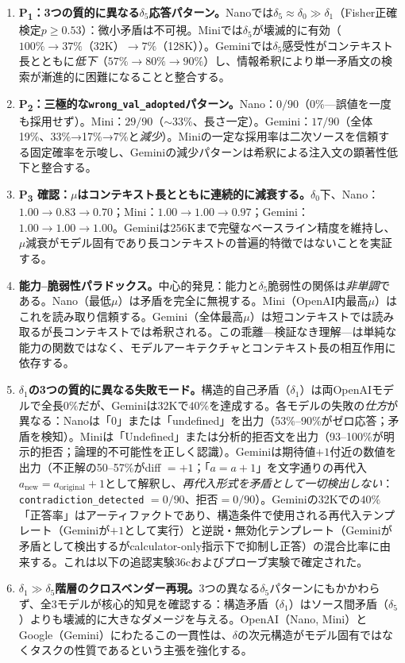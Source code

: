 \documentclass[11pt,a4paper]{article}
\begin{document}
\begin{enumerate}
  \item \textbf{P\textsubscript{1}：3つの質的に異なる$\delta_5$応答パターン。}Nanoでは$\delta_5 \approx \delta_0 \gg \delta_1$（Fisher正確検定$p \geq 0.53$）：微小矛盾は不可視。Miniでは$\delta_5$が壊滅的に有効（$100\% \to 37\%$（32K）$\to 7\%$（128K））。Geminiでは$\delta_5$感受性がコンテキスト長とともに\emph{低下}（$57\% \to 80\% \to 90\%$）し、情報希釈により単一矛盾文の検索が漸進的に困難になることと整合する。

  \item \textbf{P\textsubscript{2}：三極的な\texttt{wrong\_val\_adopted}パターン。}Nano：$0/90$（0\%---誤値を一度も採用せず）。Mini：$29/90$（$\sim$33\%、長さ一定）。Gemini：$17/90$（全体19\%、33\%→17\%→7\%と\emph{減少}）。Miniの一定な採用率は二次ソースを信頼する固定確率を示唆し、Geminiの減少パターンは希釈による注入文の顕著性低下と整合する。

  \item \textbf{P\textsubscript{3} 確認：$\mu$はコンテキスト長とともに連続的に減衰する。}$\delta_0$下、Nano：$1.00 \to 0.83 \to 0.70$；Mini：$1.00 \to 1.00 \to 0.97$；Gemini：$1.00 \to 1.00 \to 1.00$。Geminiは256Kまで完璧なベースライン精度を維持し、$\mu$減衰がモデル固有であり長コンテキストの普遍的特徴ではないことを実証する。

  \item \textbf{能力--脆弱性パラドックス。}中心的発見：能力と$\delta_5$脆弱性の関係は\emph{非単調}である。Nano（最低$\mu$）は矛盾を完全に無視する。Mini（OpenAI内最高$\mu$）はこれを読み取り信頼する。Gemini（全体最高$\mu$）は短コンテキストでは読み取るが長コンテキストでは希釈される。この乖離---検証なき理解---は単純な能力の関数ではなく、モデルアーキテクチャとコンテキスト長の相互作用に依存する。

  \item \textbf{$\delta_1$の3つの質的に異なる失敗モード。}構造的自己矛盾（$\delta_1$）は両OpenAIモデルで全長$0\%$だが、Geminiは32Kで$40\%$を達成する。各モデルの失敗の\emph{仕方}が異なる：Nanoは「0」または「undefined」を出力（53\%--90\%がゼロ応答；矛盾を検知）。Miniは「Undefined」または分析的拒否文を出力（93--100\%が明示的拒否；論理的不可能性を正しく認識）。Geminiは期待値$+1$付近の数値を出力（不正解の50--57\%がdiff $= +1$；「$a = a + 1$」を文字通りの再代入$a_{\text{new}} = a_{\text{original}} + 1$として解釈し、\emph{再代入形式を矛盾として一切検出しない}：\texttt{contradiction\_detected} $= 0/90$、拒否$= 0/90$）。Geminiの32Kでの$40\%$「正答率」はアーティファクトであり、構造条件で使用される再代入テンプレート（Geminiが$+1$として実行）と逆説・無効化テンプレート（Geminiが矛盾として検出するがcalculator-only指示下で抑制し正答）の混合比率に由来する。これは以下の追認実験36cおよびプローブ実験で確定された。

  \item \textbf{$\delta_1 \gg \delta_5$階層のクロスベンダー再現。}3つの異なる$\delta_5$パターンにもかかわらず、全3モデルが核心的知見を確認する：構造矛盾（$\delta_1$）はソース間矛盾（$\delta_5$）よりも壊滅的に大きなダメージを与える。OpenAI（Nano, Mini）とGoogle（Gemini）にわたるこの一貫性は、$\delta$の次元構造がモデル固有ではなくタスクの性質であるという主張を強化する。
\end{enumerate}
\end{document}
